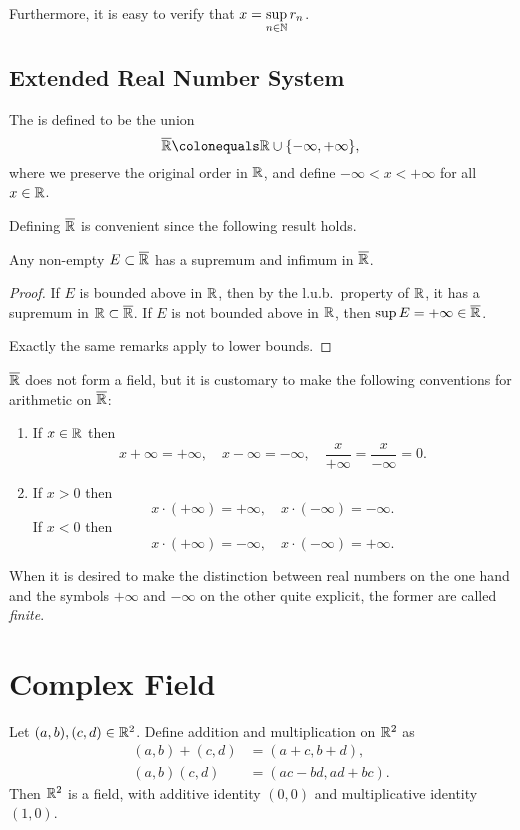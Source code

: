 Furthermore, it is easy to verify that $\displaystyle x=\sup_{n\in\mathbb N}r_n$.
\pagebreak

\subsection{Extended Real Number System}
\begin{definition}
The  is defined to be the union
\[\overline{\RR}\colonequals\RR\cup\{-\infty,+\infty\},\]
where we preserve the original order in $\mathbb R$, and define $-\infty<x<+\infty$ for all $x\in\mathbb R$.
\end{definition}

Defining $\overline{\mathbb R}$ is convenient since the following result holds.

\begin{proposition}
Any non-empty $E\subset\overline{\mathbb R}$ has a supremum and infimum in $\overline{\mathbb R}$.
\end{proposition}

\begin{proof}
If $E$ is bounded above in $\mathbb R$, then by the l.u.b.\ property of $\mathbb R$, it has a supremum in $\mathbb R\subset\overline{\mathbb R}$. If $E$ is not bounded above in $\mathbb R$, then $\sup E=+\infty\in\overline{\mathbb R}$.

Exactly the same remarks apply to lower bounds.
\end{proof}

$\overline{\mathbb R}$ does not form a field, but it is customary to make the following conventions for arithmetic on $\overline{\mathbb R}$:
\begin{enumerate}[label=(\roman*)]
\item If $x\in\mathbb R$ then
\[ x+\infty=+\infty, \quad x-\infty=-\infty, \quad \frac{x}{+\infty}=\frac{x}{-\infty}=0. \]
\item If $x>0$ then
\[x\cdot(+\infty)=+\infty,\quad x\cdot(-\infty)=-\infty.\]
If $x<0$ then
\[x\cdot(+\infty)=-\infty,\quad x\cdot(-\infty)=+\infty.\]
\end{enumerate}
When it is desired to make the distinction between real numbers on the one hand and the symbols $+\infty$ and $-\infty$ on the other quite explicit, the former are called \emph{finite}.
\pagebreak
\section{Complex Field}
\begin{lemma}
Let $(a,b),(c,d)\in\mathbb R^2$. Define addition and multiplication on $\mathbb R^2$ as
\begin{align*}
(a,b)+(c,d)&=(a+c,b+d),\\
(a,b)(c,d)&=(ac-bd,ad+bc).
\end{align*}
Then $\mathbb R^2$ is a field, with additive identity $(0,0)$ and multiplicative identity $(1,0)$.
\end{lemma}

